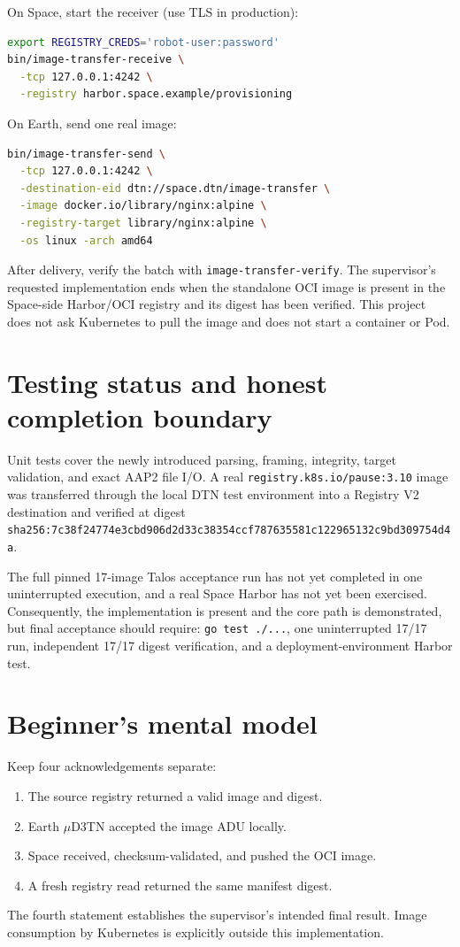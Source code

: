 \documentclass[11pt,a4paper]{article}
\newcommand{\file}[1]{\texttt{#1}}
\begin{document}
On Space, start the receiver (use TLS in production):
\begin{lstlisting}[language=bash,numbers=none]
export REGISTRY_CREDS='robot-user:password'
bin/image-transfer-receive \
  -tcp 127.0.0.1:4242 \
  -registry harbor.space.example/provisioning
\end{lstlisting}

On Earth, send one real image:
\begin{lstlisting}[language=bash,numbers=none]
bin/image-transfer-send \
  -tcp 127.0.0.1:4242 \
  -destination-eid dtn://space.dtn/image-transfer \
  -image docker.io/library/nginx:alpine \
  -registry-target library/nginx:alpine \
  -os linux -arch amd64
\end{lstlisting}

After delivery, verify the batch with \file{image-transfer-verify}. The
supervisor's requested implementation ends when the standalone OCI image is
present in the Space-side Harbor/OCI registry and its digest has been verified.
This project does not ask Kubernetes to pull the image and does not start a
container or Pod.

\section{Testing status and honest completion boundary}
Unit tests cover the newly introduced parsing, framing, integrity, target
validation, and exact AAP2 file I/O. A real
\file{registry.k8s.io/pause:3.10} image was transferred through the local DTN
test environment into a Registry V2 destination and verified at digest
\file{sha256:7c38f24774e3cbd906d2d33c38354ccf787635581c122965132c9bd309754d4a}.

The full pinned 17-image Talos acceptance run has not yet completed in one
uninterrupted execution, and a real Space Harbor has not yet been exercised.
Consequently, the implementation is present and the core path is demonstrated,
but final acceptance should require: \file{go test ./...}, one uninterrupted
17/17 run, independent 17/17 digest verification, and a deployment-environment
Harbor test.

\section{Beginner's mental model}
Keep four acknowledgements separate:
\begin{enumerate}[leftmargin=*]
\item The source registry returned a valid image and digest.
\item Earth \(\mu\)D3TN accepted the image ADU locally.
\item Space received, checksum-validated, and pushed the OCI image.
\item A fresh registry read returned the same manifest digest.
\end{enumerate}
The fourth statement establishes the supervisor's intended final result. Image
consumption by Kubernetes is explicitly outside this implementation.
\end{document}
